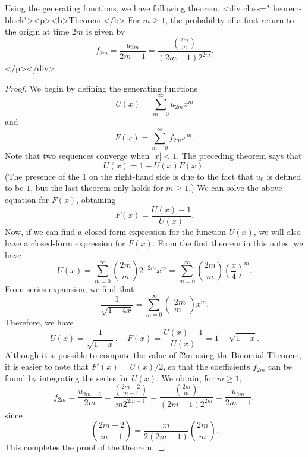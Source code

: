 Using the generating functions, we have following theorem.
<div class="theorem-block"><p><b>Theorem.</b> 
For $m \geq 1$, the probability of a first return to the origin at time
$2m$ is given by
$$\begin{equation}
    f_{2 m}=\frac{u_{2 m}}{2 m-1}=\frac{\binom{2m}{m}}{(2 m-1) 2^{2 m}}.
\end{equation}$$
</p></div>

\begin{proof}
We begin by defining the generating functions
$$\begin{equation}
    U(x)=\sum_{m=0}^{\infty} u_{2 m} x^{m}
\end{equation}$$
and 
$$\begin{equation}
    F(x)=\sum_{m=0}^{\infty} f_{2 m} x^{m}.
\end{equation}$$
Note that two sequences converge when $\left\vert x \right\vert<1$. The preceding theorem says that 
$$\begin{equation}
    U(x)=1+U(x) F(x).
\end{equation}$$
(The presence of the $1$ on the right-hand side is due to the fact that $u_0$ is defined to be $1$, but the last theorem only holds for $m \geq 1$.) We can solve the above equation for $F(x)$, obtaining
$$\begin{equation}
    F(x)=\frac{U(x)-1}{U(x)}.
\end{equation}$$
Now, if we can find a closed-form expression for the function $U(x)$, we will also have a closed-form expression for $F(x)$. From the first theorem in this notes, we have
$$\begin{equation}
    U(x)=\sum_{m=0}^{\infty}\binom{2m}{m} 2^{-2 m} x^{m} = \sum_{m=0}^\infty \binom{2m}{m} \left( \frac{x}{4} \right)^m.
\end{equation}$$
From series expansion, we find that 
$$\begin{equation}
    \frac{1}{\sqrt{1-4 x}}=\sum_{m=0}^{\infty}\left(\begin{array}{c}{2 m} \\ {m}\end{array}\right) x^{m}.
\end{equation}$$
Therefore, we have 
$$\begin{equation}
    U(x)=\frac{1}{\sqrt{1-x}}, \quad F(x) = \frac{U(x)-1}{U(x)} = 1-\sqrt{1-x}.
\end{equation}$$
Although it is possible to compute the value of f2m using the Binomial Theorem, it is easier to note that $F'(x) = U(x)/2$, so that the coefficients $f_{2m}$ can be found by integrating the series for $U(x)$. We obtain, for $m \geq 1$, 
$$\begin{equation}
    f_{2 m}=\frac{u_{2 m-2}}{2 m} = \frac{\binom{2m-2}{m-1}}{m 2^{2 m-1}} = \frac{\binom{2m}{m}}{(2 m-1) 2^{2 m}} = \frac{u_{2m}}{2m-1},
\end{equation}$$
since
$$\begin{equation}
    \binom{2m-2}{m-1} = \frac{m}{2(2 m-1)}\binom{2m}{m}.
\end{equation}$$
This completes the proof of the theorem.
\end{proof}

